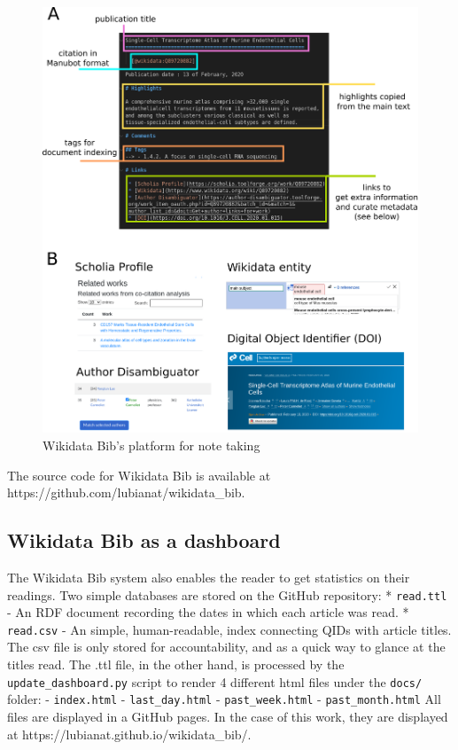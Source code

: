 \begin{figure}
\hypertarget{fig:notetaking}{%
\centering
\includegraphics{images/note_taking_station_annotated_with_links.png}
\caption{Wikidata Bib's platform for note taking}\label{fig:notetaking}
}
\end{figure}

The source code for Wikidata Bib is available at https://github.com/lubianat/wikidata\_bib.

\hypertarget{wikidata-bib-as-a-dashboard}{%
\subsection{Wikidata Bib as a dashboard}\label{wikidata-bib-as-a-dashboard}}

The Wikidata Bib system also enables the reader to get statistics on their readings.
Two simple databases are stored on the GitHub repository:
* \texttt{read.ttl} - An RDF document recording the dates in which each article was read.
* \texttt{read.csv} - An simple, human-readable, index connecting QIDs with article titles.
The csv file is only stored for accountability, and as a quick way to glance at the titles read.
The .ttl file, in the other hand, is processed by the \texttt{update\_dashboard.py} script to render 4 different html files under the \texttt{docs/} folder:
- \texttt{index.html}
- \texttt{last\_day.html}
- \texttt{past\_week.html}
- \texttt{past\_month.html}
All files are displayed in a GitHub pages.
In the case of this work, they are displayed at https://lubianat.github.io/wikidata\_bib/.


